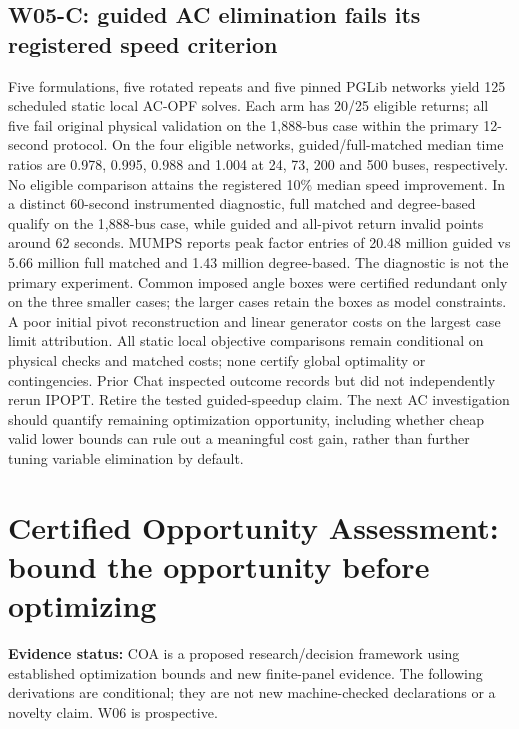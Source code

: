 \documentclass[11pt,letterpaper]{article}
\newcommand{\status}[1]{\textbf{Evidence status:} #1}
\begin{document}
\subsection{W05-C: guided AC elimination fails its registered speed criterion}
Five formulations, five rotated repeats and five pinned PGLib networks yield 125 scheduled static local AC-OPF solves. Each arm has 20/25 eligible returns; all five fail original physical validation on the 1,888-bus case within the primary 12-second protocol. On the four eligible networks, guided/full-matched median time ratios are 0.978, 0.995, 0.988 and 1.004 at 24, 73, 200 and 500 buses, respectively. No eligible comparison attains the registered 10\% median speed improvement. In a distinct 60-second instrumented diagnostic, full matched and degree-based qualify on the 1,888-bus case, while guided and all-pivot return invalid points around 62 seconds. MUMPS reports peak factor entries of 20.48 million guided vs 5.66 million full matched and 1.43 million degree-based. The diagnostic is not the primary experiment. Common imposed angle boxes were certified redundant only on the three smaller cases; the larger cases retain the boxes as model constraints. A poor initial pivot reconstruction and linear generator costs on the largest case limit attribution. All static local objective comparisons remain conditional on physical checks and matched costs; none certify global optimality or contingencies. Prior Chat inspected outcome records but did not independently rerun IPOPT. Retire the tested guided-speedup claim. The next AC investigation should quantify remaining optimization opportunity, including whether cheap valid lower bounds can rule out a meaningful cost gain, rather than further tuning variable elimination by default.

\section{Certified Opportunity Assessment: bound the opportunity before optimizing}
\label{sec:coa}
\status{COA is a proposed research/decision framework using established optimization bounds and new finite-panel evidence. The following derivations are conditional; they are not new machine-checked declarations or a novelty claim. W06 is prospective.}
\end{document}
